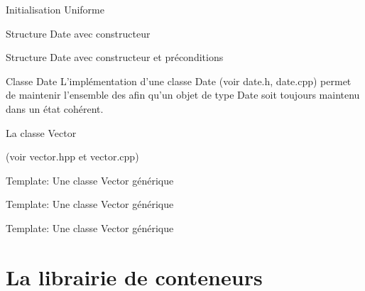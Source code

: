 \documentclass[handout]{beamer}
\let\emph\relax %
\begin{document}
\begin{frame}[fragile]{Initialisation Uniforme}
    
\end{frame}

\begin{frame}[fragile]{Structure Date avec constructeur} 
    
\end{frame}

\begin{frame}[fragile]{Structure Date avec constructeur et préconditions}
    
\end{frame}

\begin{frame}[fragile]{Classe Date}
    L'implémentation d'une classe Date (voir date.h, date.cpp) permet de maintenir l'ensemble des \emph{invariants} afin qu'un objet de type Date soit toujours maintenu dans un état cohérent.
    
\end{frame}

\begin{frame}[fragile]{La classe Vector}
    
    (voir vector.hpp et vector.cpp)
\end{frame}

\begin{frame}[fragile]{Template: Une classe Vector générique}
    
\end{frame}

\begin{frame}[fragile]{Template: Une classe Vector générique}
    
\end{frame}

\begin{frame}[fragile]{Template: Une classe Vector générique}
    
\end{frame}

\section{La librairie de conteneurs}
\end{document}
